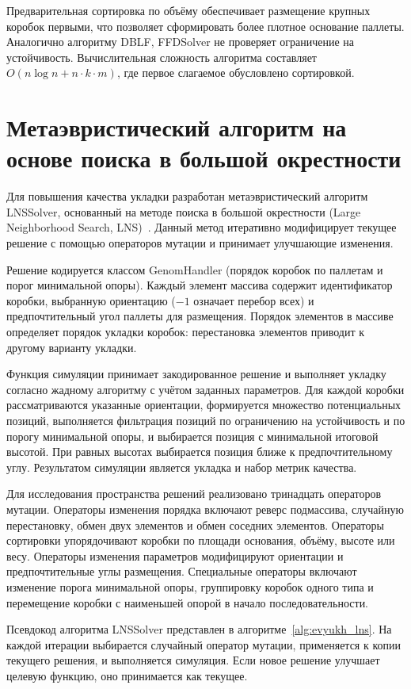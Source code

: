 Предварительная сортировка по объёму обеспечивает размещение крупных коробок первыми, что позволяет сформировать более плотное основание паллеты. Аналогично алгоритму DBLF, FFDSolver не проверяет ограничение на устойчивость. Вычислительная сложность алгоритма составляет $O(n \log n + n \cdot k \cdot m)$, где первое слагаемое обусловлено сортировкой.

\section{Метаэвристический алгоритм на основе поиска в большой окрестности}

Для повышения качества укладки разработан метаэвристический алгоритм LNSSolver, основанный на методе поиска в большой окрестности (Large Neighborhood Search, LNS)~\cite{Pisinger2005}. Данный метод итеративно модифицирует текущее решение с помощью операторов мутации и принимает улучшающие изменения.

Решение кодируется классом GenomHandler (порядок коробок по паллетам и порог минимальной опоры). Каждый элемент массива содержит идентификатор коробки, выбранную ориентацию ($-1$ означает перебор всех) и предпочтительный угол паллеты для размещения. Порядок элементов в массиве определяет порядок укладки коробок: перестановка элементов приводит к другому варианту укладки.

Функция симуляции принимает закодированное решение и выполняет укладку согласно жадному алгоритму с учётом заданных параметров. Для каждой коробки рассматриваются указанные ориентации, формируется множество потенциальных позиций, выполняется фильтрация позиций по ограничению на устойчивость и по порогу минимальной опоры, и выбирается позиция с минимальной итоговой высотой. При равных высотах выбирается позиция ближе к предпочтительному углу. Результатом симуляции является укладка и набор метрик качества.

Для исследования пространства решений реализовано тринадцать операторов мутации. Операторы изменения порядка включают реверс подмассива, случайную перестановку, обмен двух элементов и обмен соседних элементов. Операторы сортировки упорядочивают коробки по площади основания, объёму, высоте или весу. Операторы изменения параметров модифицируют ориентации и предпочтительные углы размещения. Специальные операторы включают изменение порога минимальной опоры, группировку коробок одного типа и перемещение коробки с наименьшей опорой в начало последовательности.

Псевдокод алгоритма LNSSolver представлен в алгоритме~\ref{alg:evyukh_lns}. На каждой итерации выбирается случайный оператор мутации, применяется к копии текущего решения, и выполняется симуляция. Если новое решение улучшает целевую функцию, оно принимается как текущее.

